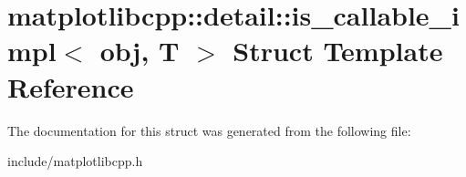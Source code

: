 \hypertarget{structmatplotlibcpp_1_1detail_1_1is__callable__impl}{}\section{matplotlibcpp\+:\+:detail\+:\+:is\+\_\+callable\+\_\+impl$<$ obj, T $>$ Struct Template Reference}
\label{structmatplotlibcpp_1_1detail_1_1is__callable__impl}


The documentation for this struct was generated from the following file\+:\begin{DoxyCompactItemize}
\item 
include/matplotlibcpp.\+h\end{DoxyCompactItemize}
